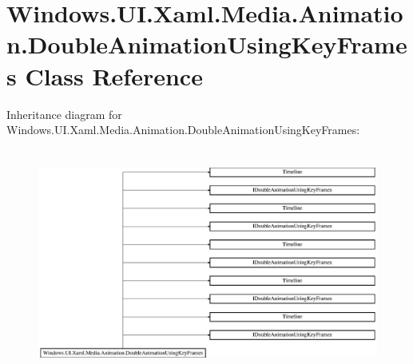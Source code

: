 \hypertarget{class_windows_1_1_u_i_1_1_xaml_1_1_media_1_1_animation_1_1_double_animation_using_key_frames}{}\section{Windows.\+U\+I.\+Xaml.\+Media.\+Animation.\+Double\+Animation\+Using\+Key\+Frames Class Reference}
\label{class_windows_1_1_u_i_1_1_xaml_1_1_media_1_1_animation_1_1_double_animation_using_key_frames}
Inheritance diagram for Windows.\+U\+I.\+Xaml.\+Media.\+Animation.\+Double\+Animation\+Using\+Key\+Frames\+:\begin{figure}[H]
\begin{center}
\leavevmode
\includegraphics[height=7.530562cm]{class_windows_1_1_u_i_1_1_xaml_1_1_media_1_1_animation_1_1_double_animation_using_key_frames}
\end{center}
\end{figure}
